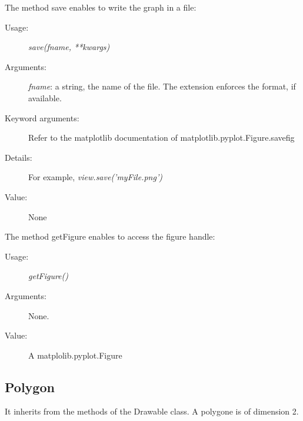 The method save enables to write the graph in a file:
\begin{description}
\item[Usage:] \textit{save(fname, **kwargs)}
\item[Arguments:] \textit{fname}: a string, the name of the file. The extension enforces the format, if available.
\item[Keyword arguments:] Refer to the matplotlib documentation of matplotlib.pyplot.Figure.savefig
\item[Details:] For example, \textit{view.save('myFile.png')}
\item[Value:] None
\end{description}

The method getFigure enables to access the figure handle:
\begin{description}
\item[Usage:] \textit{getFigure()}
\item[Arguments:] None.
\item[Value:] A matplolib.pyplot.Figure
\end{description}





\newpage
\subsection{Polygon}


It inherits from the methods of the Drawable class. A polygone is of dimension 2.

